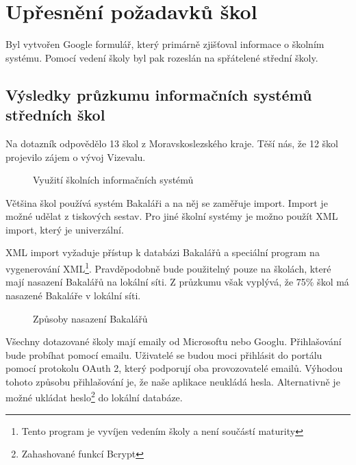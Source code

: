 \section{Upřesnění požadavků škol}
Byl vytvořen Google formulář, který primárně zjišťoval informace o školním systému. Pomocí vedení školy byl pak rozeslán na spřátelené střední školy. 
\subsection{Výsledky průzkumu informačních systémů středních škol}
Na dotazník odpovědělo 13 škol z Moravskoslezského kraje. Těší nás, že 12 škol projevilo zájem o vývoj Vizevalu.

\begin{figure}[H]
    \centering
    \caption{Využití školních informačních systémů}
    \label{fig:vyuziti-skolnich-systemu}
\end{figure}

Většina škol používá systém Bakaláři a na něj se zaměřuje import. Import je možné udělat z tiskových sestav. Pro jiné školní systémy je možno použít XML import, který je univerzální.

XML import vyžaduje přístup k databázi Bakalářů a speciální program na vygenerování XML\footnote{Tento program je vyvíjen vedením školy a není součástí maturity}. Pravděpodobně bude použitelný pouze na školách, které mají nasazení Bakalářů na lokální síti.
Z průzkumu však vyplývá, že 75\% škol má nasazené Bakaláře v lokální síti.

\begin{figure}[H]
    \centering

    \caption{Způsoby nasazení Bakalářů}
    \label{fig:poskytovatele-emailu}
\end{figure}

Všechny dotazované školy mají emaily od Microsoftu nebo Googlu.
Přihlašování bude probíhat pomocí emailu.
Uživatelé se budou moci přihlásit do portálu pomocí protokolu OAuth 2, který podporují oba provozovatelé emailů.
Výhodou tohoto způsobu přihlašování je, že naše aplikace neukládá hesla.
Alternativně je možné ukládat heslo\footnote{Zahashované funkcí Bcrypt} do lokální databáze.



